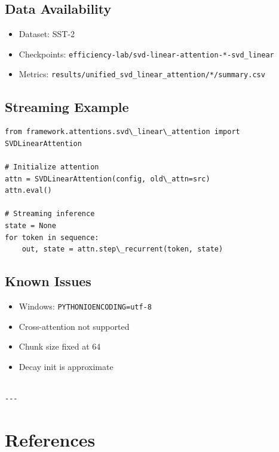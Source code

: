\subsection{Data Availability}

\begin{itemize}
\item Dataset: SST-2
\item Checkpoints: \texttt{efficiency-lab/svd-linear-attention-*-svd\_linear}
\item Metrics: \texttt{results/unified\_svd\_linear\_attention/*/summary.csv}

\end{itemize}
\subsection{Streaming Example}

\begin{lstlisting}
from framework.attentions.svd\_linear\_attention import SVDLinearAttention

# Initialize attention
attn = SVDLinearAttention(config, old\_attn=src)
attn.eval()

# Streaming inference
state = None
for token in sequence:
    out, state = attn.step\_recurrent(token, state)
\end{lstlisting}

\subsection{Known Issues}

\begin{itemize}
\item Windows: \texttt{PYTHONIOENCODING=utf-8}
\item Cross-attention not supported
\item Chunk size fixed at 64
\item Decay init is approximate
\end{itemize}
\begin{lstlisting}

---
\end{lstlisting}


\section{References}

